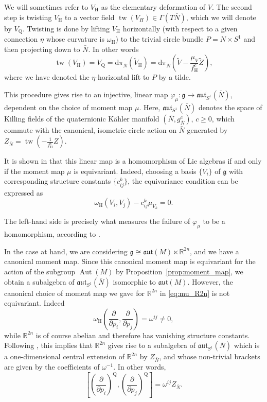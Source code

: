 \documentclass{article}
\theoremstyle{definition}
\DeclareMathOperator{\Aut}{Aut}
\newcommand{\R}{\mathbb{R}}
\newcommand{\frg}{\mathfrak{g}}
\newcommand{\hor}{\mathrm{H}}
\newcommand{\rmQ}{\mathrm{Q}}
\newcommand{\aut}{\mathfrak{aut}}
\newcommand{\pd}[2]{\frac{\partial #1}{\partial #2}}
\renewcommand{\d}{\mathrm{d}}
\begin{document}
	We will sometimes refer to $V_\hor$ as the elementary deformation of $V$. The second step is twisting $V_\hor$ to a vector field $\operatorname{tw}(V_H)\in\Gamma(T\bar{N})$, which we will denote by $V_{\rmQ}$. Twisting is done by lifting $V_\hor$ horizontally (with respect to a given connection $\eta$ whose curvature is $\omega_\hor$) to the trivial circle bundle $P=N\times S^1$ and then projecting down to $\bar{N}$. In other words $$\operatorname{tw}(V_\hor)=V_{\rmQ}=\d\pi_{\bar{N}}(\tilde{V}_\hor)=\d\pi_{\bar{N}}\left(\tilde{V}-\frac{\mu_V}{f_\hor^c}\tilde{Z}\right),$$ where we have denoted the $\eta$-horizontal lift to $P$ by a tilde.\medskip
	
	This procedure gives rise to an injective, linear map $\varphi_\mu:\frg\longrightarrow\aut_{S^1}(\bar{N})$, dependent on the choice of moment map $\mu$. Here, $\aut_{S^1}(\bar{N})$ denotes the space of Killing fields of the quaternionic K\"ahler manifold $(\bar{N},g_{\bar{N}}^c)$, $c\geq0$, which commute with the canonical, isometric circle action on $\bar{N}$ generated by $Z_{\bar{N}}=\operatorname{tw}(-\frac{1}{f_\hor^c}Z)$.\medskip
	
	It is shown in \cite{CST21} that this linear map is a homomorphism of Lie algebras if and only if the moment map $\mu$ is equivariant. Indeed, choosing a basis $\{V_i\}$ of $\frg$ with corresponding structure constants $\{c_{ij}^k\}$, the equivariance condition can be expressed as $$\omega_\hor(V_i,V_j)-c_{ij}^k\mu_{V_k}=0.$$
	
	The left-hand side is precisely what measures the failure of $\varphi_\mu$ to be a homomorphism, according to \cite[Theorem~3.8]{CST21}.\medskip
	
	In the case at hand, we are considering $\frg\cong\aut(M)\ltimes\R^{2n}$, and we have a canonical moment map. Since this canonical moment map is equivariant for the action of the subgroup $\Aut(M)$ by Proposition~\ref{prop:moment_map}, we obtain a subalgebra of $\aut_{S^1}(\bar{N})$ isomorphic to $\aut(M)$. However, the canonical choice of moment map we gave for $\R^{2n}$ in \eqref{eq:mu_R2n} is not equivariant. Indeed $$\omega_\hor\left(\pd{}{p_i},\pd{}{p_j}\right)=\omega^{ij}\neq0,$$ while $\R^{2n}$ is of course abelian and therefore has vanishing structure constants. Following \cite[Theorem~3.8]{CST21}, this implies that $\R^{2n}$ gives rise to a subalgebra of $\aut_{S^1}(\bar{N})$ which is a one-dimensional central extension of $\R^{2n}$ by $Z_{\bar{N}}$, and whose non-trivial brackets are given by the coefficients of $\omega^{-1}$. In other words, $$\left[\left(\pd{}{p_i}\right)^{\rmQ},\left(\pd{}{p_j}\right)^{\rmQ}\right]=\omega^{ij}Z_{\bar{N}}.$$
	
\end{document}
